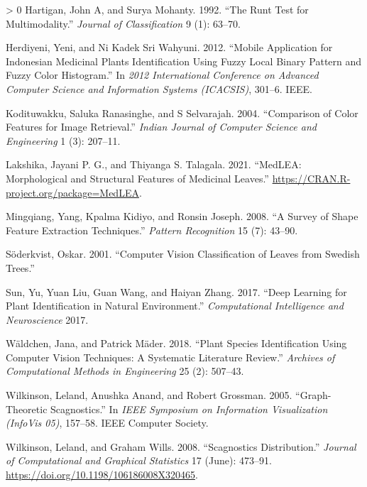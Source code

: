 \documentclass{article}
\newlength{\cslhangindent}
\newenvironment{CSLReferences}[3] %
 {%
  \setlength{\parindent}{0pt}
  \ifodd #1 \everypar{\setlength{\hangindent}{\cslhangindent}}\ignorespaces\fi
  \ifnum #2 > 0
  \setlength{\parskip}{#2\baselineskip}
  \fi
 }%
 {}
\begin{document}
\begin{CSLReferences}{1}{0}
\leavevmode\hypertarget{ref-hartigan1992runt}{}%
Hartigan, John A, and Surya Mohanty. 1992. {``The Runt Test for
Multimodality.''} \emph{Journal of Classification} 9 (1): 63--70.

\leavevmode\hypertarget{ref-inproceedings}{}%
Herdiyeni, Yeni, and Ni Kadek Sri Wahyuni. 2012. {``Mobile Application
for Indonesian Medicinal Plants Identification Using Fuzzy Local Binary
Pattern and Fuzzy Color Histogram.''} In \emph{2012 International
Conference on Advanced Computer Science and Information Systems
(ICACSIS)}, 301--6. IEEE.

\leavevmode\hypertarget{ref-colarticle1}{}%
Kodituwakku, Saluka Ranasinghe, and S Selvarajah. 2004. {``Comparison of
Color Features for Image Retrieval.''} \emph{Indian Journal of Computer
Science and Engineering} 1 (3): 207--11.

\leavevmode\hypertarget{ref-medlea}{}%
Lakshika, Jayani P. G., and Thiyanga S. Talagala. 2021. {``MedLEA:
Morphological and Structural Features of Medicinal Leaves.''}
\url{https://CRAN.R-project.org/package=MedLEA}.

\leavevmode\hypertarget{ref-article7}{}%
Mingqiang, Yang, Kpalma Kidiyo, and Ronsin Joseph. 2008. {``A Survey of
Shape Feature Extraction Techniques.''} \emph{Pattern Recognition} 15
(7): 43--90.

\leavevmode\hypertarget{ref-soderkvist2001computer}{}%
Söderkvist, Oskar. 2001. {``Computer Vision Classification of Leaves
from Swedish Trees.''}

\leavevmode\hypertarget{ref-sun2017deep}{}%
Sun, Yu, Yuan Liu, Guan Wang, and Haiyan Zhang. 2017. {``Deep Learning
for Plant Identification in Natural Environment.''} \emph{Computational
Intelligence and Neuroscience} 2017.

\leavevmode\hypertarget{ref-articlee}{}%
Wäldchen, Jana, and Patrick Mäder. 2018. {``Plant Species Identification
Using Computer Vision Techniques: A Systematic Literature Review.''}
\emph{Archives of Computational Methods in Engineering} 25 (2): 507--43.

\leavevmode\hypertarget{ref-inproceedings44}{}%
Wilkinson, Leland, Anushka Anand, and Robert Grossman. 2005.
{``Graph-Theoretic Scagnostics.''} In \emph{IEEE Symposium on
Information Visualization (InfoVis 05)}, 157--58. IEEE Computer Society.

\leavevmode\hypertarget{ref-article37}{}%
Wilkinson, Leland, and Graham Wills. 2008. {``Scagnostics
Distribution.''} \emph{Journal of Computational and Graphical
Statistics} 17 (June): 473--91.
\url{https://doi.org/10.1198/106186008X320465}.


\end{CSLReferences}
\end{document}
